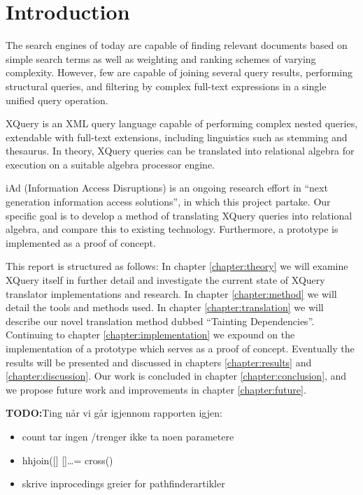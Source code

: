 \chapter{Introduction}
\label{chapter:introduction}
% 


The search engines of today are capable of finding relevant documents based
on simple search terms as well as weighting and ranking schemes of varying
complexity. However, few are capable of joining several query results,
performing structural queries, and filtering by complex full-text expressions
in a single unified query operation. 

XQuery is an XML query language capable of performing complex nested
queries, extendable with full-text extensions, including linguistics such as
stemming and thesaurus. In theory, XQuery queries can be translated into
relational algebra for execution on a suitable algebra processor engine.

iAd \cite{iadcentre} (Information Access Disruptions) is an ongoing research
effort in ``next generation information access solutions'', in which this
project partake. Our specific goal is to develop a method of translating XQuery queries into relational algebra,
and compare this to existing technology. Furthermore, a prototype is implemented as a proof of concept. 

This report is structured as follows:
In chapter \ref{chapter:theory} we will examine XQuery itself in further detail
and investigate the current state of XQuery translator implementations and
research. In chapter \ref{chapter:method} we will detail the tools and methods
used. In chapter \ref{chapter:translation} we will describe our novel
translation method dubbed ``Tainting Dependencies''. Continuing to chapter
\ref{chapter:implementation} we expound on the implementation of a prototype
which serves as a proof of concept. Eventually the results will be
presented and discussed in chapters \ref{chapter:results} and
\ref{chapter:discussion}. Our work is concluded in chapter
\ref{chapter:conclusion}, and we propose future work and improvements in
chapter \ref{chapter:future}.



\textbf{\LARGE TODO:}Ting n\aa r vi g\aa r igjennom rapporten igjen:
\begin{itemize}
  \item count tar ingen /trenger ikke ta noen parametere
  \item hhjoin([] []\ldots = cross()
  \item skrive inprocedings greier for pathfinderartikler
\end{itemize}
